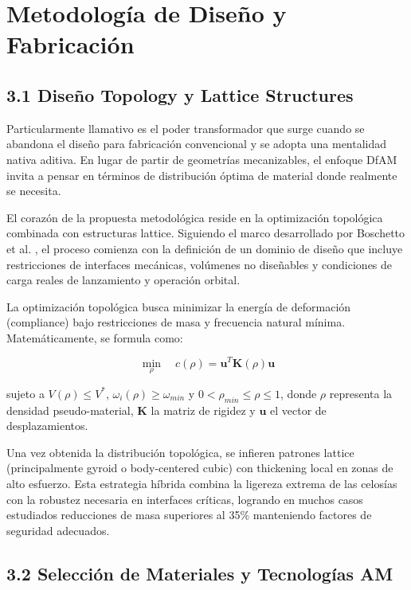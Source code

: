 \section{Metodología de Diseño y Fabricación}

\subsection{3.1 Diseño Topology y Lattice Structures}

Particularmente llamativo es el poder transformador que surge cuando se abandona el diseño para fabricación convencional y se adopta una mentalidad nativa aditiva. En lugar de partir de geometrías mecanizables, el enfoque DfAM invita a pensar en términos de distribución óptima de material donde realmente se necesita.

El corazón de la propuesta metodológica reside en la optimización topológica combinada con estructuras lattice. Siguiendo el marco desarrollado por Boschetto et al. \cite{Boschetto2023}, el proceso comienza con la definición de un dominio de diseño que incluye restricciones de interfaces mecánicas, volúmenes no diseñables y condiciones de carga reales de lanzamiento y operación orbital. 

La optimización topológica busca minimizar la energía de deformación (compliance) bajo restricciones de masa y frecuencia natural mínima. Matemáticamente, se formula como:

\begin{equation}
\min_{\rho} \quad c(\rho) = \mathbf{u}^T \mathbf{K}(\rho) \mathbf{u}
\label{eq:topo_opt}
\end{equation}

sujeto a $V(\rho) \leq V^*$, $\omega_i(\rho) \geq \omega_{min}$ y $0 < \rho_{min} \leq \rho \leq 1$, donde $\rho$ representa la densidad pseudo-material, $\mathbf{K}$ la matriz de rigidez y $\mathbf{u}$ el vector de desplazamientos.

Una vez obtenida la distribución topológica, se infieren patrones lattice (principalmente gyroid o body-centered cubic) con thickening local en zonas de alto esfuerzo. Esta estrategia híbrida combina la ligereza extrema de las celosías con la robustez necesaria en interfaces críticas, logrando en muchos casos estudiados reducciones de masa superiores al 35\% manteniendo factores de seguridad adecuados.

\subsection{3.2 Selección de Materiales y Tecnologías AM}

